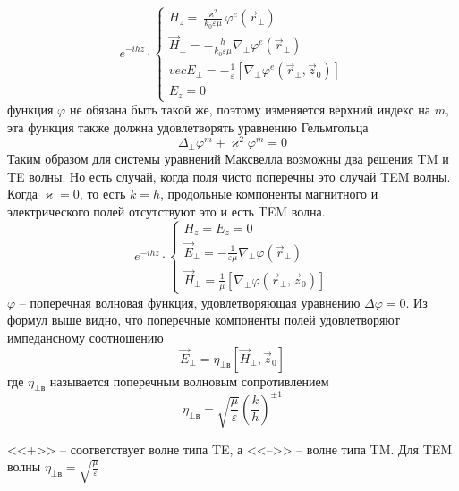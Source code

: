 \documentclass[a4paper,14pt]{extarticle}
\renewcommand{\phi}{\varphi}
\renewcommand{\epsilon}{\varepsilon}
\renewcommand{\kappa}{\varkappa}
\begin{document}
\begin{equation}
	e^{-ihz}\cdot\left\{
	\begin{aligned}
		H_z = \frac{\kappa^2}{k_0\epsilon\mu}\phi^e(\vec{r}_\perp) \\
		\vec{H}_\perp = -\frac{h}{k_0\epsilon\mu}\nabla_\perp\phi^e(\vec{r}_\perp) \\
		vec{E}_\perp = -\frac{1}{\epsilon}[\nabla_\perp\phi^e(\vec{r}_\perp,\vec{z}_0)] \\
		\displaystyle E_z = 0
	\end{aligned}\right.
\end{equation}
функция $\phi$ не обязана быть такой же, поэтому изменяется верхний индекс на $m$, эта функция также должна удовлетворять уравнению Гельмгольца  
\begin{equation}
	\Delta_\perp\phi^{m} + \kappa^2\phi^{m}=0
\end{equation}
Таким образом для системы уравнений Максвелла возможны два решения TM и TE волны. Но есть случай, когда поля чисто поперечны это случай TEM волны.
Когда $\kappa = 0$, то есть $k=h$, продольные компоненты магнитного и электрического полей отсутствуют это и есть TEM волна.
\begin{equation}
	e^{-ihz}\cdot\left\{
	\begin{aligned}
		H_z = E_z = 0\\
		\vec{E}_\perp = -\frac{1}{\epsilon\mu}\nabla_\perp\phi(\vec{r}_\perp)\\
		\vec{H}_\perp = \frac{1}{\mu}[\nabla_\perp\phi(\vec{r}_\perp,\vec{z}_0)]
	\end{aligned}\right.
\end{equation}
$\phi$ -- поперечная волновая функция, удовлетворяющая уравнению $\Delta\phi=0$.
Из формул выше видно, что поперечные компоненты полей удовлетворяют импедансному соотношению
\begin{equation}
	\vec{E}_\perp = \eta_{\perp\text{в}}[\vec{H}_\perp,\vec{z}_0]
\end{equation}
где $\eta_{\perp\text{в}}$ называется поперечным волновым сопротивлением
\begin{equation}
	\eta_{\perp\text{в}}=\sqrt{\frac{\mu}{\epsilon}} \left( \frac{k}{h} \right)^{\pm 1}
\end{equation} 
	
<<+>> -- соответствует волне типа TE, а <<-->> -- волне типа TM. 
Для TEM волны $\displaystyle \eta_{\perp\text{в}}=\sqrt{\frac{\mu}{\epsilon}}$
\end{document}
